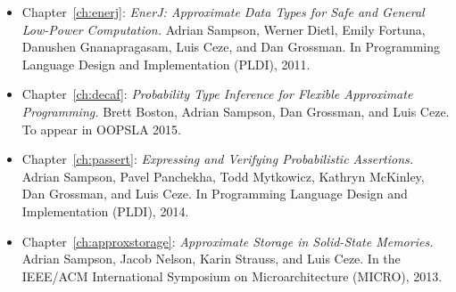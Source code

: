 \begin{itemize}
\item Chapter~\ref{ch:enerj}:
\textit{EnerJ: Approximate Data Types for Safe and General Low-Power
Computation.}
Adrian Sampson, Werner Dietl, Emily Fortuna, Danushen Gnanapragasam, Luis Ceze, and Dan Grossman.
In Programming Language Design and Implementation (PLDI), 2011.
\cite{enerj}

\item Chapter~\ref{ch:decaf}:
\textit{Probability Type Inference for Flexible Approximate Programming.}
Brett Boston, Adrian Sampson, Dan Grossman, and Luis Ceze.
To appear in OOPSLA 2015.
\cite{decaf}

\item Chapter~\ref{ch:passert}:
\textit{Expressing and Verifying Probabilistic Assertions.}
Adrian Sampson, Pavel Panchekha, Todd Mytkowicz, Kathryn McKinley, Dan Grossman, and Luis Ceze.
In Programming Language Design and Implementation (PLDI), 2014.
\cite{passert}

\item Chapter~\ref{ch:approxstorage}:
\textit{Approximate Storage in Solid-State Memories.}
Adrian Sampson, Jacob Nelson, Karin Strauss, and Luis Ceze.
In the IEEE/ACM International Symposium on Microarchitecture (MICRO), 2013.
\cite{approxstorage}
\end{itemize}
